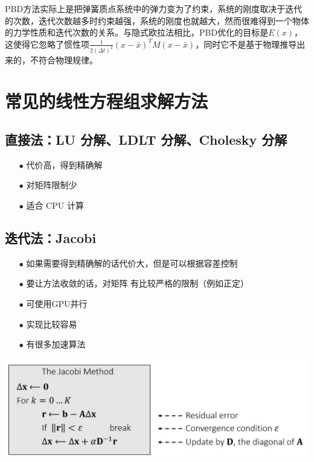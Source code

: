 \documentclass{CLGPY}
\begin{document}
\begin{multicols}{2}
		PBD方法实际上是把弹簧质点系统中的弹力变为了约束，系统的刚度取决于迭代的次数，迭代次数越多时约束越强，系统的刚度也就越大，然而很难得到一个物体的力学性质和迭代次数的关系。与隐式欧拉法相比，PBD优化的目标是$E(x)$，这使得它忽略了惯性项$\frac{1}{2(\Delta t)^2}(x-\bar x)^TM(x-\bar x)$，同时它不是基于物理推导出来的，不符合物理规律。

		\section{常见的线性方程组求解方法}
		\subsection{直接法：LU 分解、LDLT 分解、Cholesky 分解}
		\begin{itemize}
			\item[$\bullet$] 代价高，得到精确解
			\item[$\bullet$] 对矩阵限制少
			\item[$\bullet$] 适合 CPU 计算
		\end{itemize}

		\subsection{迭代法：Jacobi}
		\begin{itemize}
			\item[$\bullet$] 如果需要得到精确解的话代价大，但是可以根据容差控制
			\item[$\bullet$] 要让方法收敛的话，对矩阵 有比较严格的限制（例如正定）
			\item[$\bullet$] 可使用GPU并行
			\item[$\bullet$] 实现比较容易
			\item[$\bullet$] 有很多加速算法
		\end{itemize}

        \begin{center}
            \includegraphics[width=1.0\linewidth]{./fig/Jacobi.jpg}
        \end{center}


\end{multicols}
\end{document}
